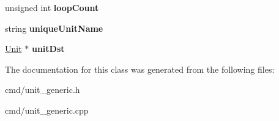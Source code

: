 \begin{DoxyCompactItemize}
\item 
unsigned int {\bfseries loop\+Count}\hypertarget{classMeshAnimation_a4ce23d0673a810b1c8e33ea5867978a2}{}\label{classMeshAnimation_a4ce23d0673a810b1c8e33ea5867978a2}

\item 
string {\bfseries unique\+Unit\+Name}\hypertarget{classMeshAnimation_ae3a1a053b6a80740d628548037cb8dfa}{}\label{classMeshAnimation_ae3a1a053b6a80740d628548037cb8dfa}

\item 
\hyperlink{classUnit}{Unit} $\ast$ {\bfseries unit\+Dst}\hypertarget{classMeshAnimation_a92938e6f16ce068330960ab869c2579a}{}\label{classMeshAnimation_a92938e6f16ce068330960ab869c2579a}

\end{DoxyCompactItemize}


The documentation for this class was generated from the following files\+:\begin{DoxyCompactItemize}
\item 
cmd/unit\+\_\+generic.\+h\item 
cmd/unit\+\_\+generic.\+cpp\end{DoxyCompactItemize}
